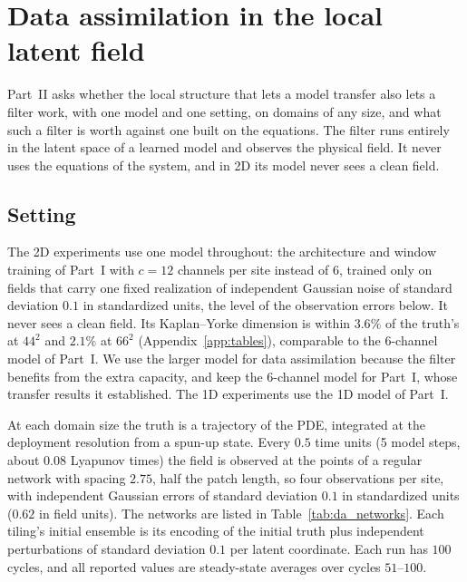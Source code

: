 \section{Data assimilation in the local latent field}
\label{sec:da_results}

Part~II asks whether the local structure that lets a model transfer also
lets a filter work, with one model and one setting, on domains of any
size, and what such a filter is worth against one built on the
equations. The filter runs entirely in the latent space of a learned
model and observes the physical field. It never uses the equations of
the system, and in 2D its model never sees a clean field.

\subsection{Setting}
\label{sec:da_setting}

 The 2D experiments use one model throughout: the
architecture and window training of Part~I with $c=12$ channels per site
instead of 6, trained only on fields that carry one fixed realization of
independent Gaussian noise of standard deviation $0.1$ in standardized
units, the level of the observation errors below. It never sees a clean
field. Its Kaplan--Yorke dimension is within $3.6\%$ of the truth's at
$44^2$ and $2.1\%$ at $66^2$ (Appendix~\ref{app:tables}), comparable to the
6-channel model of Part~I. We use the larger model for data assimilation
because the filter benefits from the extra capacity, and keep the
6-channel model for Part~I, whose transfer results it established. The
1D experiments use the 1D model of Part~I.

 At each domain size the truth is a trajectory of
the PDE, integrated at the deployment resolution from a spun-up state.
Every $0.5$ time units (5 model steps, about $0.08$ Lyapunov times) the
field is observed at the points of a regular network with spacing
$2.75$, half the patch length, so four observations per site, with
independent Gaussian errors of standard deviation $0.1$ in standardized
units ($0.62$ in field units). The networks are listed in
Table~\ref{tab:da_networks}. Each tiling's initial ensemble is its
encoding of the initial truth plus independent perturbations of
standard deviation $0.1$ per latent coordinate. Each run has $100$
cycles, and all reported values are steady-state averages over cycles
$51$--$100$.

